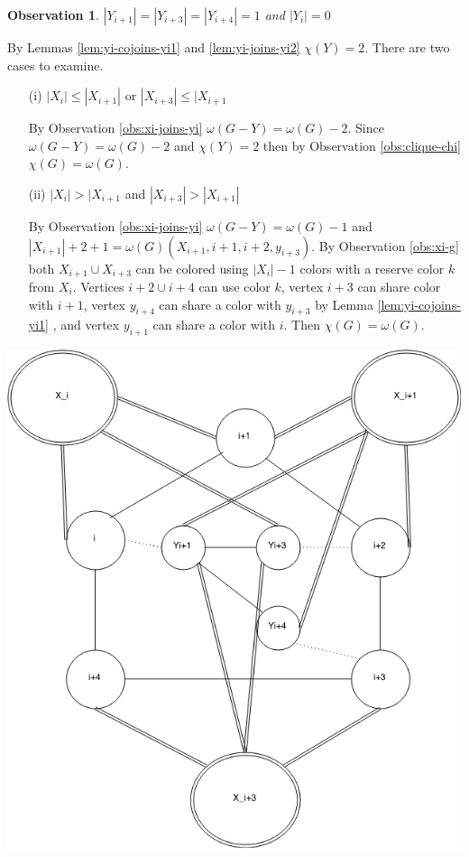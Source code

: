 \documentclass[12pt]{article}
\newtheorem{Observation}[Theorem]{Observation}
\begin{document}
\begin{Observation}\label{obs:yi1-yi3-yi4} 
$|Y_{i+1}| = |Y_{i+3}| =  |Y_{i+4}| = 1$ and $|Y_{i}| = 0$
\end{Observation}
\begin{minipage}{0.5\textwidth}%
	 By Lemmas \ref{lem:yi-cojoins-yi1} and \ref{lem:yi-joins-yi2} $\chi(Y) = 2$. There are two cases to examine.
	\begin{itemize}
	\item[(i)]
		$|X_i| \leq |X_{i+1}|$ or $|X_{i+3}| \leq |X_{i+1}$

		 By Observation \ref{obs:xi-joins-yi} $\omega(G - Y) = \omega(G) - 2$. Since $\omega(G - Y) = \omega(G) - 2$ and $\chi(Y) = 2$ then by Observation \ref{obs:clique-chi} $\chi(G) = \omega(G)$.
	\item[(ii)]
		$|X_i| > |X_{i+1}$ and $|X_{i+3}| > |X_{i+1}|$

		By Observation \ref{obs:xi-joins-yi} $\omega(G - Y) = \omega(G) - 1$ and $|X_{i+1}| + 2 + 1 = \omega(G) (X_{i+1},i+1,i+2, y_{i+3})$. By Observation \ref{obs:xi-g} both $X_{i+1} \cup X_{i+3}$ can be colored using $|X_{i}| - 1$ colors with a reserve color $k$ from $X_{i}$. Vertices $i+2 \cup i+4$ can use color $k$, vertex $i+3$ can share color with $i+1$, vertex $y_{i+4}$ can share a color with $y_{i+3}$ by Lemma \ref{lem:yi-cojoins-yi1} , and vertex $y_{i+1}$ can share a color with $i$.  Then $\chi(G) = \omega(G)$.
	\end{itemize}
\end{minipage}
\hfill
\begin{minipage}{0.5\textwidth}\raggedleft
	\includegraphics[width=\linewidth]{Yi1-Yi3-Yi4.png}
\end{minipage}
\end{document}

